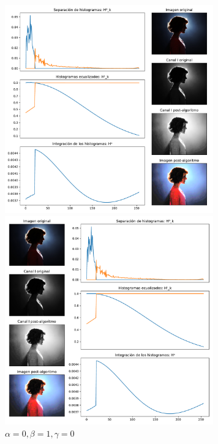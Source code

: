 \begin{figure}[H]
\begin{minipage}[c]{0.48\linewidth}
  \includegraphics[height=9cm]{imgs/wom-1-9-0.pdf}
  \caption{$\alpha = 0.1, \beta = 0.9, \gamma = 0$}
\end{minipage}
\hfill
\begin{minipage}[c]{0.48\linewidth}
  \includegraphics[height=9cm]{imgs/wom-0-1-0.pdf}
  \caption{$\alpha = 0, \beta = 1, \gamma = 0$}
\end{minipage}%
\end{figure}
